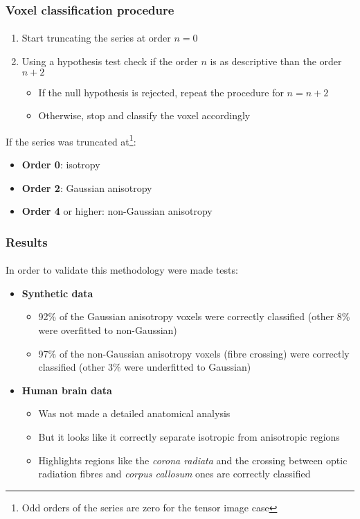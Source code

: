 \documentclass[10pt]{beamer}
\begin{document}
\begin{frame}
  \frametitle{Voxel classification procedure}
  \framesubtitle{}

  \begin{enumerate}
    \item Start truncating the series at order $n = 0$
    \item Using a hypothesis test check if the order $n$ is as descriptive than the order $n + 2$
      \begin{itemize}
        \item If the null hypothesis is rejected, repeat the procedure for $n = n + 2$
        \item Otherwise, stop and classify the voxel accordingly
      \end{itemize}
  \end{enumerate}

  If the series was truncated at\footnote{Odd orders of the series are zero for the tensor image case}:
  \begin{itemize}
    \item \textbf{Order 0}: isotropy
    \item \textbf{Order 2}: Gaussian anisotropy
    \item \textbf{Order 4} or higher: non-Gaussian anisotropy
  \end{itemize}
\end{frame}

\begin{frame}

  \frametitle{Results}
  \framesubtitle{}

  In order to validate this methodology were made tests:

  \begin{itemize}
    \item \textbf{Synthetic data}
      \begin{itemize}
        \item 92\% of the Gaussian anisotropy voxels were correctly classified (other 8\% were overfitted to non-Gaussian)
        \item 97\% of the non-Gaussian anisotropy voxels (fibre crossing) were correctly classified (other 3\% were underfitted to Gaussian)
      \end{itemize}
    \item \textbf{Human brain data}
      \begin{itemize}
        \item Was not made a detailed anatomical analysis
        \item But it looks like it correctly separate isotropic from anisotropic regions
        \item Highlights regions like the \textit{corona radiata} and the crossing between optic radiation fibres and \textit{corpus callosum} ones are correctly classified
      \end{itemize}
  \end{itemize}
\end{frame}
\end{document}
